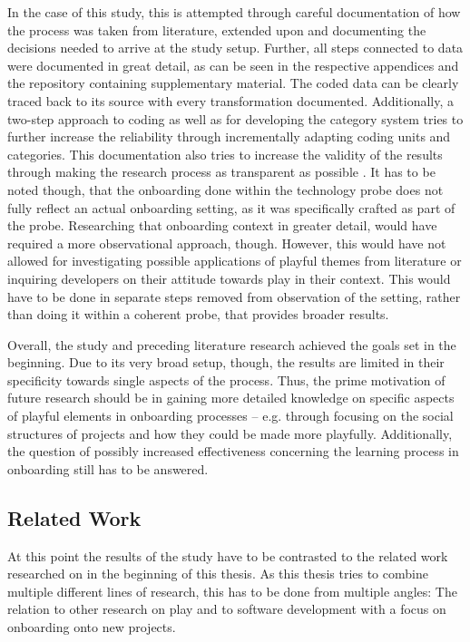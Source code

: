 In the case of this study, this is attempted through careful documentation of how the process was taken from literature, extended upon and documenting the decisions needed to arrive at the study setup. Further, all steps connected to data were documented in great detail, as can be seen in the respective appendices and the repository containing supplementary material. The coded data can be clearly traced back to its source with every transformation documented. Additionally, a two-step approach to coding as well as for developing the category system tries to further increase the reliability through incrementally adapting coding units and categories. This documentation also tries to increase the validity of the results through making the research process as transparent as possible \cite[p. 546]{flick2018introduction}. It has to be noted though, that the onboarding done within the technology probe does not fully reflect an actual onboarding setting, as it was specifically crafted as part of the probe. Researching that onboarding context in greater detail, would have required a more observational approach, though. However, this would have not allowed for investigating possible applications of playful themes from literature or inquiring developers on their attitude towards play in their context. This would have to be done in separate steps removed from observation of the setting, rather than doing it within a coherent probe, that provides broader results.

Overall, the study and preceding literature research achieved the goals set in the beginning. Due to its very broad setup, though, the results are limited in their specificity towards single aspects of the process. Thus, the prime motivation of future research should be in gaining more detailed knowledge on specific aspects of playful elements in onboarding processes -- e.g. through focusing on the social structures of projects and how they could be made more playfully. Additionally, the question of possibly increased effectiveness concerning the learning process in onboarding still has to be answered.

\subsection{Related Work}

At this point the results of the study have to be contrasted to the related work researched on in the beginning of this thesis. As this thesis tries to combine multiple different lines of research, this has to be done from multiple angles: The relation to other research on play and to software development with a focus on onboarding onto new projects.


